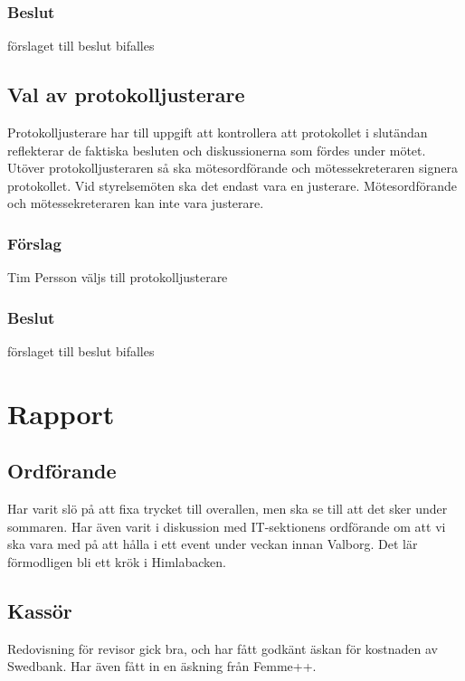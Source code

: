 \documentclass[protokoll]{dvd}
\begin{document}
\subsubsection*{Beslut}
\begin{attsatser}
    \item förslaget till beslut bifalles
\end{attsatser}

\subsection{Val av protokolljusterare}

Protokolljusterare har till uppgift att kontrollera att protokollet i slutändan reflekterar de faktiska besluten och diskussionerna som fördes under mötet.
Utöver protokolljusteraren så ska mötesordförande och mötessekreteraren signera protokollet.
Vid styrelsemöten ska det endast vara en justerare.
Mötesordförande och mötessekreteraren kan inte vara justerare.

\subsubsection*{Förslag}
\begin{attsatser}
    \item Tim Persson väljs till protokolljusterare
\end{attsatser}
\subsubsection*{Beslut}
\begin{attsatser}
    \item förslaget till beslut bifalles
\end{attsatser}

\section{Rapport}
\subsection{Ordförande}
Har varit slö på att fixa trycket till overallen, men
ska se till att det sker under sommaren.
Har även varit i diskussion med IT-sektionens ordförande
om att vi ska vara med på att hålla i ett event under
veckan innan Valborg. Det lär förmodligen bli ett krök
i Himlabacken.

\subsection{Kassör}
Redovisning för revisor gick bra, och har fått godkänt äskan för kostnaden av Swedbank.
Har även fått in en äskning från Femme++.
\end{document}
